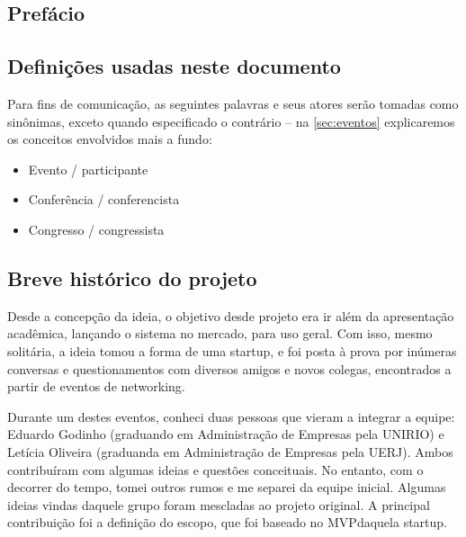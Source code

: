 \documentclass[12pt,a4paper,twoside,hyphens,english,brazil]{abntex2}
\begin{document}
\frenchspacing %

\imprimircapa
\imprimirfolhaderosto


\begin{KeepFromToc}
\tableofcontents

\chapter*{Prefácio}
\section*{Definições usadas neste documento}
Para fins de comunicação, as seguintes palavras e seus atores serão tomadas como sinônimas, exceto quando especificado o contrário -- na \autoref{sec:eventos} explicaremos os conceitos envolvidos mais a fundo:
\begin{itemize}
	\item Evento / participante
	\item Conferência / conferencista
	\item Congresso / congressista
\end{itemize}


\section*{Breve histórico do projeto}
Desde a concepção da ideia, o objetivo desde projeto era ir além da apresentação acadêmica, lançando o sistema no mercado, para uso geral. Com isso, mesmo solitária, a ideia tomou a forma de uma startup, e foi posta à prova por inúmeras conversas e questionamentos com diversos amigos e novos colegas, encontrados a partir de eventos de networking.

Durante um destes eventos, conheci duas pessoas que vieram a integrar a equipe: Eduardo Godinho (graduando em Administração de Empresas pela UNIRIO) e Letícia Oliveira (graduanda em Administração de Empresas pela UERJ). Ambos contribuíram com algumas ideias e questões conceituais. No entanto, com o decorrer do tempo, tomei outros rumos e me separei da equipe inicial. Algumas ideias vindas daquele grupo foram mescladas ao projeto original. A principal contribuição foi a definição do escopo, que foi baseado no MVP\footnotemark daquela startup.


\end{KeepFromToc}
\end{document}
